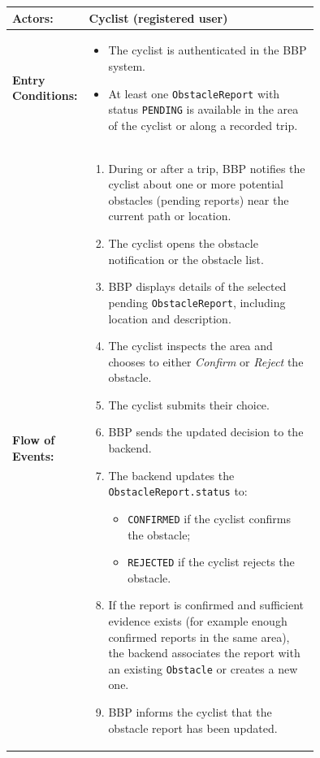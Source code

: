 \begin{center}
\begin{longtable}{|l|p{0.75\linewidth}|}
    \hline
    \textbf{Actors:}           
    & Cyclist (registered user)                                                                      \\
    \hline

    \textbf{Entry Conditions:} 
    & \begin{itemize}
          \item The cyclist is authenticated in the BBP system.
          \item At least one \texttt{ObstacleReport} with status \texttt{PENDING} is available in the area of the cyclist or along a recorded trip.
       \end{itemize}                                                                                 \\
    \hline

    \textbf{Flow of Events:}   
    & \begin{enumerate}
          \item During or after a trip, BBP notifies the cyclist about one or more potential obstacles (pending reports) near the current path or location.
          \item The cyclist opens the obstacle notification or the obstacle list.
          \item BBP displays details of the selected pending \texttt{ObstacleReport}, including location and description.
          \item The cyclist inspects the area and chooses to either \emph{Confirm} or \emph{Reject} the obstacle.
          \item The cyclist submits their choice.
          \item BBP sends the updated decision to the backend.
          \item The backend updates the \texttt{ObstacleReport.status} to:
                \begin{itemize}
                    \item \texttt{CONFIRMED} if the cyclist confirms the obstacle;
                    \item \texttt{REJECTED} if the cyclist rejects the obstacle.
                \end{itemize}
          \item If the report is confirmed and sufficient evidence exists (for example enough confirmed reports in the same area), the backend associates the report with an existing \texttt{Obstacle} or creates a new one.
          \item BBP informs the cyclist that the obstacle report has been updated.
       \end{enumerate}                                                                                \\
    \hline


\end{longtable}
\end{center}
